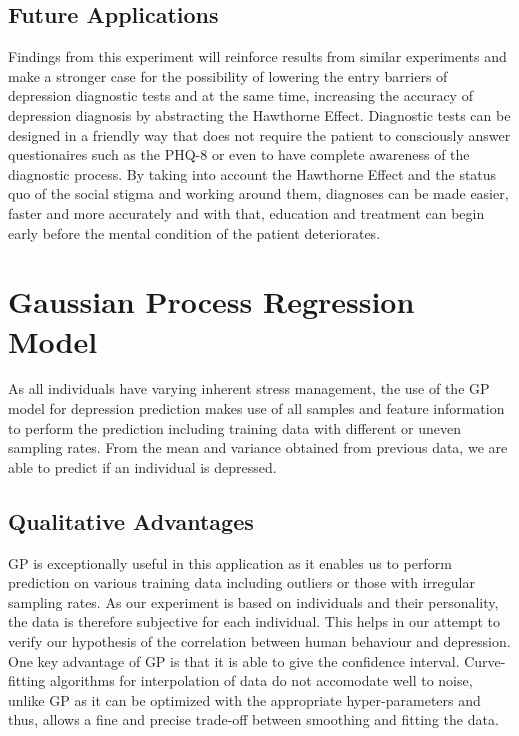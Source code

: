 \documentclass{article}
\begin{document}
	\subsection{Future Applications}
	Findings from this experiment will reinforce results from similar experiments and make a stronger case for the possibility of lowering the entry barriers of depression diagnostic tests and at the same time, increasing the accuracy of depression diagnosis by abstracting the Hawthorne Effect. Diagnostic tests can be designed in a friendly way that does not require the patient to consciously answer questionaires such as the PHQ-8 or even to have complete awareness of the diagnostic process. By taking into account the Hawthorne Effect and the status quo of the social stigma and working around them, diagnoses can be made easier, faster and more accurately and with that, education and treatment can begin early before the mental condition of the patient deteriorates. \\
	
	\section{Gaussian Process Regression Model}
	As all individuals have varying inherent stress management, the use of the GP model for depression prediction makes use of all samples and feature information to perform the prediction including training data with different or uneven sampling rates. 
	From the mean and variance obtained from previous data, we are able to predict if an individual is depressed. \\	

	\subsection{Qualitative Advantages}
	 GP is exceptionally useful in this application as it enables us to perform prediction on various training data including outliers or those with irregular sampling rates. 
	As our experiment is based on individuals and their personality, the data is therefore subjective for each individual. This helps in our attempt to verify our hypothesis of the correlation between human behaviour and depression. \\

	One key advantage of GP is that it is able to give the confidence interval. 
	Curve-fitting algorithms for interpolation of data do not accomodate well to noise, unlike GP as it can be optimized with the appropriate hyper-parameters and thus, allows a fine and precise trade-off between smoothing and fitting the data. \\
\end{document}
